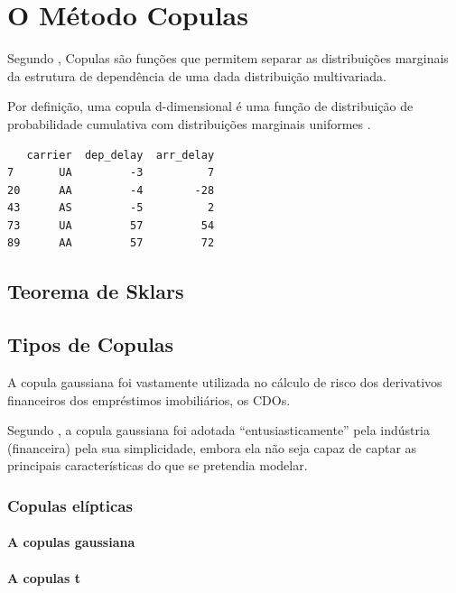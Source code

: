 \documentclass[
	12pt,				%
	oneside,			%
	a4paper,			%
	chapter=TITLE,		%
	section=TITLE,		%
	english,			%
	brazil				%
	]{abntex2}
\begin{document}
\hypertarget{copulas}{%
\chapter{O Método Copulas}\label{copulas}}

Segundo \textcite{copulas}, Copulas são funções que permitem separar as distribuições
marginais da estrutura de dependência de uma dada distribuição multivariada.

Por definição, uma copula d-dimensional é uma função de distribuição de
probabilidade cumulativa com distribuições marginais uniformes \autocite[1]{copulas}.
\begin{verbatim}
   carrier  dep_delay  arr_delay
7       UA         -3          7
20      AA         -4        -28
43      AS         -5          2
73      UA         57         54
89      AA         57         72
\end{verbatim}
\hypertarget{teorema-de-sklars}{%
\section{Teorema de Sklars}\label{teorema-de-sklars}}

\hypertarget{tipos-de-copulas}{%
\section{Tipos de Copulas}\label{tipos-de-copulas}}

A copula gaussiana foi vastamente utilizada no cálculo de risco dos derivativos
financeiros dos empréstimos imobiliários, os \gls{CDO}s.

Segundo \textcite{devil}, a copula gaussiana foi adotada ``entusiasticamente'' pela
indústria (financeira) pela sua simplicidade, embora ela não seja capaz de
captar as principais características do que se pretendia modelar.

\hypertarget{copulas-eluxedpticas}{%
\subsection{Copulas elípticas}\label{copulas-eluxedpticas}}

\hypertarget{a-copulas-gaussiana}{%
\subsubsection{A copulas gaussiana}\label{a-copulas-gaussiana}}

\hypertarget{a-copulas-t}{%
\subsubsection{A copulas t}\label{a-copulas-t}}
\end{document}
